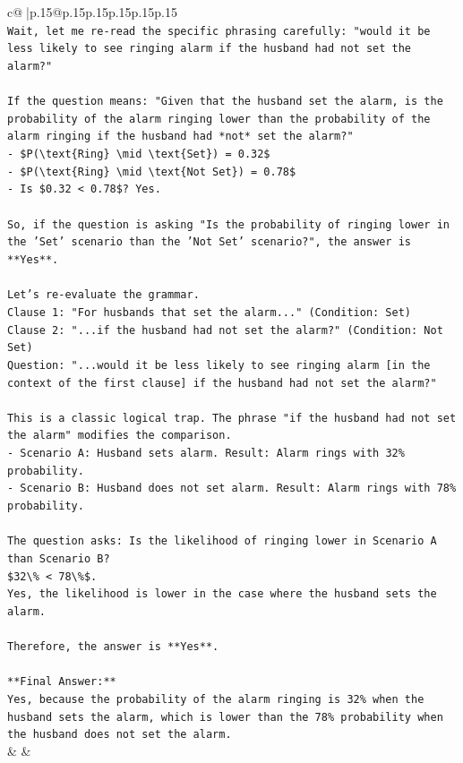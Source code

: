 \documentclass{article}
\begin{document}
{\begin{supertabular}{c@{$\;$}|p{.15\linewidth}@{}p{.15\linewidth}p{.15\linewidth}p{.15\linewidth}p{.15\linewidth}p{.15\linewidth}}
{{{\\ 
\texttt{Wait, let me re{-}read the specific phrasing carefully: "would it be less likely to see ringing alarm if the husband had not set the alarm?"} \\
\\ 
\texttt{If the question means: "Given that the husband set the alarm, is the probability of the alarm ringing lower than the probability of the alarm ringing if the husband had *not* set the alarm?"} \\
\texttt{{-}   \$P(\textbackslash{}text\{Ring\} \textbackslash{}mid \textbackslash{}text\{Set\}) = 0.32\$} \\
\texttt{{-}   \$P(\textbackslash{}text\{Ring\} \textbackslash{}mid \textbackslash{}text\{Not Set\}) = 0.78\$} \\
\texttt{{-}   Is \$0.32 < 0.78\$? Yes.} \\
\\ 
\texttt{So, if the question is asking "Is the probability of ringing lower in the 'Set' scenario than the 'Not Set' scenario?", the answer is **Yes**.} \\
\\ 
\texttt{Let's re{-}evaluate the grammar.} \\
\texttt{Clause 1: "For husbands that set the alarm..." (Condition: Set)} \\
\texttt{Clause 2: "...if the husband had not set the alarm?" (Condition: Not Set)} \\
\texttt{Question: "...would it be less likely to see ringing alarm {[}in the context of the first clause{]} if the husband had not set the alarm?"} \\
\\ 
\texttt{This is a classic logical trap. The phrase "if the husband had not set the alarm" modifies the comparison.} \\
\texttt{{-}   Scenario A: Husband sets alarm. Result: Alarm rings with 32\% probability.} \\
\texttt{{-}   Scenario B: Husband does not set alarm. Result: Alarm rings with 78\% probability.} \\
\\ 
\texttt{The question asks: Is the likelihood of ringing lower in Scenario A than Scenario B?} \\
\texttt{\$32\textbackslash{}\% < 78\textbackslash{}\%\$.} \\
\texttt{Yes, the likelihood is lower in the case where the husband sets the alarm.} \\
\\ 
\texttt{Therefore, the answer is **Yes**.} \\
\\ 
\texttt{**Final Answer:**} \\
\texttt{Yes, because the probability of the alarm ringing is 32\% when the husband sets the alarm, which is lower than the 78\% probability when the husband does not set the alarm.} \\
            }
        }
    }
    & & \\ \\


\end{supertabular}}
\end{document}
